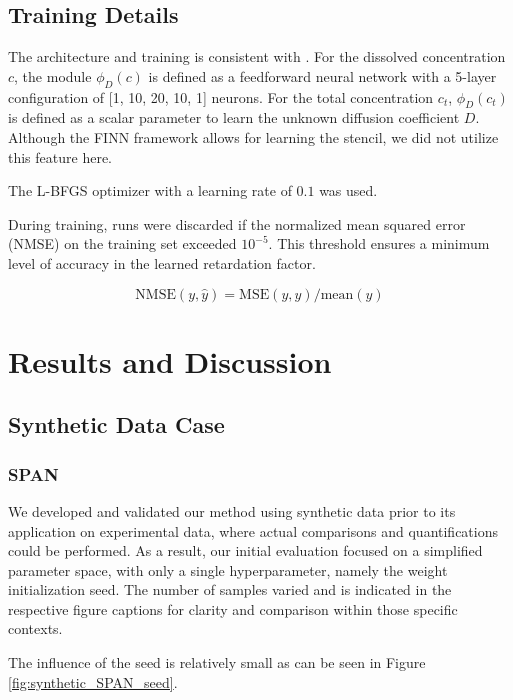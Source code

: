 \subsection{Training Details}
The architecture and training is consistent with \cite{finn}. For the dissolved concentration $c$, the module $\phi_D(c)$ is defined as a feedforward neural network with a 5-layer configuration of [1, 10, 20, 10, 1] neurons. For the total concentration $c_t$, $\phi_D(c_t)$ is defined as a scalar parameter to learn the unknown diffusion coefficient $D$. Although the FINN framework allows for learning the stencil, we did not utilize this feature here.

The L-BFGS optimizer \cite{malouf2002comparison} with a learning rate of $0.1$ was used.

During training, runs were discarded if the normalized mean squared error (NMSE) on the training set exceeded $10^{-5}$. This threshold ensures a minimum level of accuracy in the learned retardation factor.


\begin{equation*}
    \text{NMSE}(y, \hat{y}) = \text{MSE}(y, \hat{y}) / \text{mean}(y)
\end{equation*}




\section{Results and Discussion}

\subsection{Synthetic Data Case}
\subsubsection{SPAN}
We developed and validated our method using synthetic data prior to its application on experimental data, where actual comparisons and quantifications could be performed. As a result, our initial evaluation focused on a simplified parameter space, with only a single hyperparameter, namely the weight initialization seed.
The number of samples varied and is indicated in the respective figure captions for clarity and comparison within those specific contexts. %

The influence of the seed is relatively small as can be seen in Figure \vref{fig:synthetic_SPAN_seed}.


